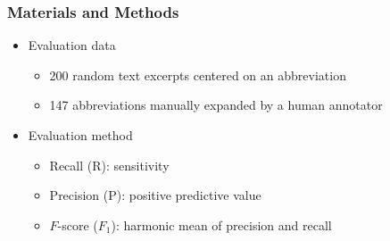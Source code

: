 \begin{frame}
	\frametitle{Materials and Methods}
	\begin{itemize} \myspacing
	        \item Evaluation data
                \begin{itemize}
                		\item 200 random text excerpts centered on an abbreviation
			\item 147 abbreviations manually expanded by a human annotator
                \end{itemize}
	        \item Evaluation method
                \begin{itemize}
                		\item Recall (R): sensitivity
			\item Precision (P): positive predictive value
			\item $F$-score ($F_1$): harmonic mean of precision and recall
                \end{itemize}
	\end{itemize}
\end{frame}




